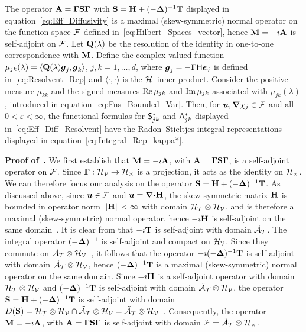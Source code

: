 \documentclass[amsa]{ipart}
\begin{document}
\begin{corollary}\label{cor:Integral_Reps}
  The operator $\mathbf{A}=\mbox{\boldmath${\Gamma}$}\mathbf{S}\mbox{\boldmath${\Gamma}$}$ with
  $\mathbf{S}=\mathbf{H}+(-\mbox{\boldmath${\Delta}$})^{-1}\mathbf{T}$ displayed in
  equation~\eqref{eq:Eff_Diffusivity} is a maximal (skew-symmetric)
  normal operator on the function space $\mathcal{F}$ defined
  in~\eqref{eq:Hilbert_Spaces_vector}, hence $\mathbf{M}=-\imath\mathbf{A}$ is
  self-adjoint on $\mathcal{F}$. Let $\mathbf{Q}(\lambda)$ be the resolution of the
  identity in one-to-one correspondence with $\mathbf{M}$. Define the complex
  valued function $\mu_{jk}(\lambda)=\langle\mathbf{Q}(\lambda)\boldsymbol{g}_j,\boldsymbol{g}_k\rangle$, $j,k=1,\ldots,d$,
  where $ \boldsymbol{g}_j=-\mbox{\boldmath${\Gamma}$}\mathsf{H}\boldsymbol{e}_j$ is defined
  in~\eqref{eq:Resolvent_Rep} and $\langle\cdot,\cdot\rangle$ is the
  $\mathcal{H}$--inner-product. Consider the positive measure $\mu_{kk}$ and the
  signed measures $\mbox{Re}\,\mu_{jk}$ and $\mbox{Im}\,\mu_{jk}$ associated with
  $\mu_{jk}(\lambda)$, introduced in
  equation~\eqref{eq:Fns_Bounded_Var}. Then, for
  $\boldsymbol{u},\mbox{\boldmath${\nabla}$}\chi_j\in\mathcal{F}$ and all $0<\varepsilon<\infty$, the functional formulas for
  $\mathsf{S}^*_{jk}$ and $\mathsf{A}^*_{jk}$ displayed
  in~\eqref{eq:Eff_Diff_Resolvent} have the Radon--Stieltjes integral
  representations displayed in
  equation~\eqref{eq:Integral_Rep_kappa*}.     
% 
\end{corollary}
%


\textbf{Proof of~.}\hspace{1ex}
%
We first establish that $\mathbf{M}=-\imath \mathbf{A}$, with $\mathbf{A}=\mbox{\boldmath${\Gamma}$}\mathbf{S}\mbox{\boldmath${\Gamma}$}$, is
a self-adjoint operator on $\mathcal{F}$. Since $\mbox{\boldmath${\Gamma}$}:\mathcal{H}_{\mathcal{V}}\to\mathcal{H}_\times$ is a
projection, it acts as the identity on $\mathcal{H}_\times$. We can therefore focus
our analysis on the operator $\mathbf{S}=\mathbf{H}+(-\mbox{\boldmath${\Delta}$})^{-1}\mathbf{T}$. As
discussed above, since $\boldsymbol{u}\in\mathcal{F}$ and $\boldsymbol{u}=\mbox{\boldmath${\nabla}$}\mbox{\boldmath${\cdot}$}\mathbf{H}$, the
skew-symmetric matrix $\mathbf{H}$ is bounded in operator norm $\|\mathbf{H}\|<\infty$ with
domain $\mathcal{H}_{\mathcal{T}}\otimes\mathcal{H}_{\mathcal{V}}$, and is therefore a maximal
(skew-symmetric) normal operator, hence $-\imath\mathbf{H}$ is self-adjoint on the same
domain~\cite{Stone:64}. It is clear from 
that $-\imath\mathbf{T}$ is self-adjoint with domain $\tilde{\mathcal{A}}_{\mathcal{T}}$. The
integral operator $(-\mbox{\boldmath${\Delta}$})^{-1}$ is self-adjoint and compact on
$\mathcal{H}_{\mathcal{V}}$. Since they commute on
$\tilde{\mathcal{A}}_{\mathcal{T}}\otimes\mathcal{H}_{\mathcal{V}}$~\cite{Folland:99:RealAnalysis}, it
follows that the operator $-\imath(-\mbox{\boldmath${\Delta}$})^{-1}\mathbf{T}$ is self-adjoint with
domain $\tilde{\mathcal{A}}_{\mathcal{T}}\otimes\mathcal{H}_{\mathcal{V}}$, hence $(-\mbox{\boldmath${\Delta}$})^{-1}\mathbf{T}$ is a
maximal (skew-symmetric) normal operator on the same domain.
Since $-\imath\mathbf{H}$ is a self-adjoint operator with
domain $\mathcal{H}_{\mathcal{T}}\otimes\mathcal{H}_{\mathcal{V}}$ and $(-\mbox{\boldmath${\Delta}$})^{-1}\mathbf{T}$ is self-adjoint with
domain $\tilde{\mathcal{A}}_{\mathcal{T}}\otimes\mathcal{H}_{\mathcal{V}}$, the operator
$\mathbf{S}=\mathbf{H}+(-\mbox{\boldmath${\Delta}$})^{-1}\mathbf{T}$ is self-adjoint with domain 
$D(\mathbf{S})=\mathcal{H}_{\mathcal{T}}\otimes\mathcal{H}_{\mathcal{V}}\cap\tilde{\mathcal{A}}_{\mathcal{T}}\otimes\mathcal{H}_{\mathcal{V}}=\tilde{\mathcal{A}}_{\mathcal{T}}\otimes\mathcal{H}_{\mathcal{V}}$~\cite{Stone:64}. Consequently,
the operator $\mathbf{M}=-\imath\mathbf{A}$, with $\mathbf{A}=\mbox{\boldmath${\Gamma}$}\mathbf{S}\mbox{\boldmath${\Gamma}$}$ is self-adjoint
with domain $\mathcal{F}=\tilde{\mathcal{A}}_{\mathcal{T}}\otimes\mathcal{H}_\times$.
\end{document}
